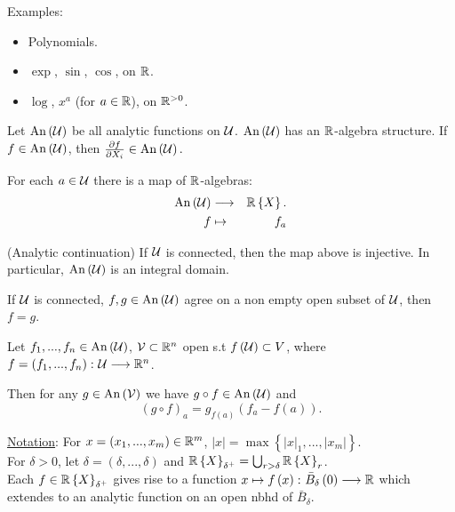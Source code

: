 Examples:
\begin{itemize}
\item Polynomials.
\item $\exp$, $\sin$, $\cos$, on $\mathbb{R}$.
\item $\log$, $x^{a}$ (for $a\in\mathbb{R}$), on $\mathbb{R}^{>0}$.
\end{itemize}
Let $\mathrm{An}\left(\mathcal{U}\right)$ be all analytic functions on $\mathcal{U}$.
$\mathrm{An}\left(\mathcal{U}\right)$ has an $\mathbb{R}$-algebra structure. If $f\in\mathrm{An}\left(\mathcal{U}\right)$,
then $\frac{\partial f}{\partial X_{i}}\in\mathrm{An}\left(\mathcal{U}\right).$

For each $a\in\mathcal{U}$ there is a map of $\mathbb{R}$-algebras:
\begin{eqnarray*}
\mathrm{An}\left(\mathcal{U}\right) & \longrightarrow & \mathbb{R}\left\{ X\right\} .\\
f & \mapsto & f_{a}
\end{eqnarray*}

\begin{prop*}
\label{11.2} (Analytic continuation) If $\mathcal{U}$ is connected, then the map
above is injective. In particular, $\mathrm{An}\left(\mathcal{U}\right)$ is an integral
domain.\end{prop*}
\begin{cor*}
\label{11.3} If $\mathcal{U}$ is connected, $f,g\in\mathrm{An}\left(\mathcal{U}\right)$ agree on
a non empty open subset of $\mathcal{U}$, then $f=g$.\end{cor*}
\begin{prop*}
\label{11.4} Let $f_{1},...,f_{n}\in\mathrm{An}\left(\mathcal{U}\right)$, $\mathcal{V}\subset\mathbb{R}^{n}$
open s.t $f\left(\mathcal{U}\right)\subset V$, where $f=\left(f_{1},...,f_{n}\right)\colon\mathcal{U}\longrightarrow\mathbb{R}^{n}$.

Then for any $g\in\mathrm{An}\left(\mathcal{V}\right)$ we have $g\circ f\in\mathrm{An}\left(\mathcal{U}\right)$
and 
\[
\left(g\circ f\right)_{a}=g_{f\left(a\right)}\left(f_{a}-f\left(a\right)\right).
\]

\end{prop*}
\label{11.5} \uline{Notation}: For $x=\left(x_{1},...,x_{m}\right)\in\mathbb{R}^{m}$,
$\left|x\right|=\max\left\{ \left|x\right|_{1},...,\left|x_{m}\right|\right\} $.
\\
For $\delta>0$, let $\delta=\left(\delta,...,\delta\right)$ and
$\mathbb{R}\left\{ X\right\} _{\delta^{+}}=\bigcup_{r>\delta}\mathbb{R}\left\{ X\right\} _{r}$.\\
Each $f\in\mathbb{R}\left\{ X\right\} _{\delta^{+}}$ gives rise to a function
$x\mapsto f\left(x\right)\colon\bar{B}_{\delta}\left(0\right)\longrightarrow\mathbb{R}$
which extendes to an analytic function on an open nbhd of $\bar{B}_{\delta}$.

